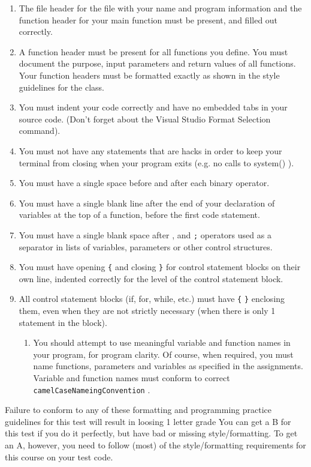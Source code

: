 \documentclass[11pt]{article}
\begin{document}
\begin{enumerate}
\item The file header for the file with your name and program information
  and the function header for your main function must be present, and
  filled out correctly.
\item A function header must be present for all functions you define.
   You must document the purpose, input parameters and return values
   of all functions.  Your function headers must be formatted exactly
   as shown in the style guidelines for the class.
\item You must indent your code correctly and have no embedded tabs in
  your source code. (Don't forget about the Visual Studio Format
  Selection command).
\item You must not have any statements that are hacks in order to keep
   your terminal from closing when your program exits (e.g. no calls
   to system() ).
\item You must have a single space before and after each binary operator.
\item You must have a single blank line after the end of your declaration
  of variables at the top of a function, before the first code
  statement.
\item You must have a single blank space after , and \verb~;~ operators used as a
  separator in lists of variables, parameters or other control
  structures.
\item You must have opening \verb~{~ and closing \verb~}~ for control statement blocks
  on their own line, indented correctly for the level of the control
  statement block.
\item All control statement blocks (if, for, while, etc.) must have \verb~{~
   \verb~}~ enclosing them, even when they are not strictly necessary
   (when there is only 1 statement in the block).
\begin{enumerate}
\item You should attempt to use meaningful variable and function names in
   your program, for program clarity.  Of course, when required, you
   must name functions, parameters and variables as specified in the
   assignments.  Variable and function names must conform to correct
   \verb~camelCaseNameingConvention~ .
\end{enumerate}
\end{enumerate}

Failure to conform to any of these formatting and programming practice
guidelines for this test will result in loosing 1 letter grade You can
get a B for this test if you do it perfectly, but have bad or missing
style/formatting.  To get an A, however, you need to follow (most) of
the style/formatting requirements for this course on your test code.
\end{document}
